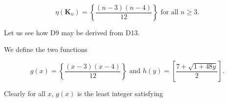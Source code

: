 $$\eta(\mathbf{K}_n) = \left\{ \frac{(n-3)(n-4)}{12} \right\} \text{ for all } n \geq 3.$$

Let us see how D9 may be derived from D13.

We define the two functions

$$g(x) = \left\{ \frac{(x-3)(x-4)}{12} \right\} \text{ and } h(y) = \left[ \frac{7+\sqrt{1+48y}}{2} \right].$$

Clearly for all $x$, $g(x)$ is the least integer satisfying
